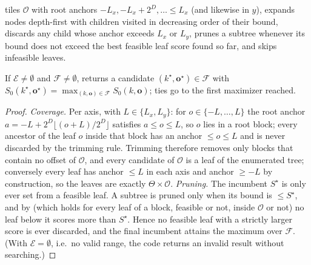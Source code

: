  tiles $\mathcal{O}$ with root anchors $-L_x,-L_x+2^D,\dots\le L_x$ (and likewise in $y$), expands nodes depth-first with children visited in decreasing order of their bound, discards any child whose anchor exceeds $L_x$ or $L_y$, prunes a subtree whenever its bound does not exceed the best feasible leaf score found so far, and skips infeasible leaves.

\begin{corollary}\label{cor:bbs}
If $\mathcal{E}\neq\emptyset$ and $\mathcal{F}\neq\emptyset$,  returns a candidate $(k^\star,\mathbf{o}^\star)\in\mathcal{F}$ with $S_0(k^\star,\mathbf{o}^\star)=\max_{(k,\mathbf{o})\in\mathcal{F}}S_0(k,\mathbf{o})$; ties go to the first maximizer reached.
\end{corollary}
\begin{proof}
\emph{Coverage.} Per axis, with $L\in\{L_x,L_y\}$: for $o\in\{-L,\dots,L\}$ the root anchor $a=-L+2^D\lfloor(o+L)/2^D\rfloor$ satisfies $a\le o\le L$, so $o$ lies in a root block; every ancestor of the leaf $o$ inside that block has an anchor $\le o\le L$ and is never discarded by the trimming rule. Trimming therefore removes only blocks that contain no offset of $\mathcal{O}$, and every candidate of $\mathcal{O}$ is a leaf of the enumerated tree; conversely every leaf has anchor $\le L$ in each axis and anchor $\ge-L$ by construction, so the leaves are exactly $\Theta\times\mathcal{O}$. \emph{Pruning.} The incumbent $S^\star$ is only ever set from a feasible leaf. A subtree is pruned only when its bound is $\le S^\star$, and by  (which holds for every leaf of a block, feasible or not, inside $\mathcal{O}$ or not) no leaf below it scores more than $S^\star$. Hence no feasible leaf with a strictly larger score is ever discarded, and the final incumbent attains the maximum over $\mathcal{F}$. (With $\mathcal{E}=\emptyset$, i.e.\ no valid range, the code returns an invalid result without searching.)
\end{proof}

